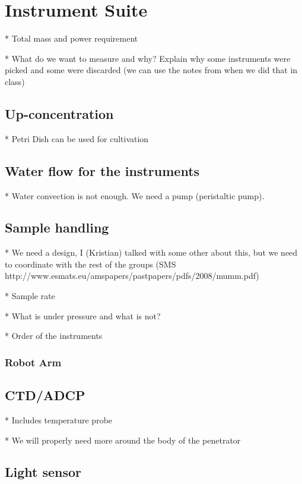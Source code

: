 \chapter{Instrument Suite}

* Total mass and power requirement

* What do we want to measure and why? Explain why some instruments were picked and some were discarded (we can use the notes from when we did that in class)

\section{Up-concentration}

* Petri Dish can be used for cultivation

\section{Water flow for the instruments} %

* Water convection is not enough. We need a pump (peristaltic pump).

\section{Sample handling}

* We need a design, I (Kristian) talked with some other about this, but we need to coordinate with the rest of the groups
   (SMS http://www.esmats.eu/amspapers/pastpapers/pdfs/2008/mumm.pdf)

* Sample rate

* What is under pressure and what is not?

* Order of the instruments

\subsection{Robot Arm} %


\section{CTD/ADCP} %

* Includes temperature probe

    * We will properly need more around the body of the penetrator

\section{Light sensor}

